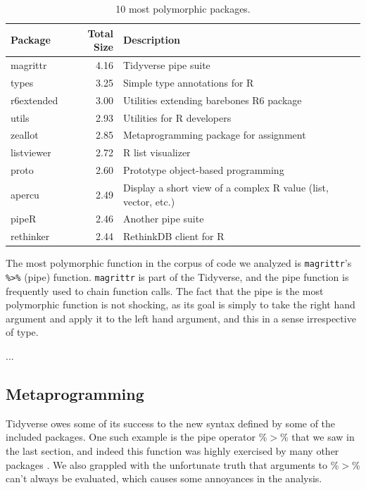 \documentclass[acmsmall,10pt,review,anonymous]{acmart}\settopmatter{printfolios=true,printccs=false,printacmref=false}
\begin{document}
\begin{table}[ht]
\label{tab:packagepolysize}
\centering
\begin{tabular}{lrl}
  \hline
Package & Total Size & Description \\ 
  \hline
  magrittr & 4.16 & Tidyverse pipe suite \\ 
  types & 3.25 & Simple type annotations for R \\ 
  r6extended & 3.00 & Utilities extending barebones R6 package \\ 
  utils & 2.93 & Utilities for R developers \\ 
  zeallot & 2.85 & Metaprogramming package for assignment \\ 
  listviewer & 2.72 & R list visualizer \\ 
  proto & 2.60 & Prototype object-based programming \\ 
  apercu & 2.49 & Display a short view of a complex R value (list, vector, etc.) \\ 
  pipeR & 2.46 & Another pipe suite \\ 
  rethinker & 2.44 & RethinkDB client for R \\ 
   \hline
\end{tabular}
\caption{10 most polymorphic packages.}
\end{table}




The most polymorphic function in the corpus of code we analyzed is {\tt magrittr}'s {\tt \%>\%} (pipe) function.
{\tt magrittr} is part of the Tidyverse, and the pipe function is frequently used to chain function calls.
The fact that the pipe is the most polymorphic function is not shocking, as its goal is simply to take the right hand argument and apply it to the left hand argument, and this in a sense irrespective of type.

...

%
%
%
%
\subsection{Metaprogramming}


Tidyverse owes some of its success to the new syntax defined by some of the included packages.
One such example is the pipe operator \%$>$\% that we saw in the last section, and indeed this function was highly exercised by many other packages .
We also grappled with the unfortunate truth that arguments to \%$>$\% can't always be evaluated, which causes some annoyances in the analysis.
\end{document}
